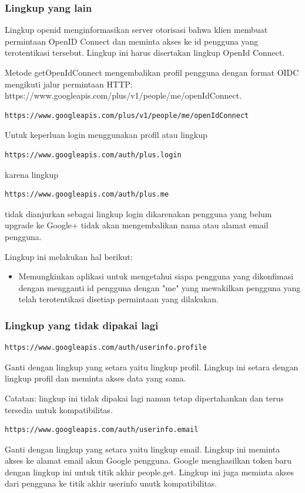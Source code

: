 \subsubsection{Lingkup yang lain}
Lingkup openid menginformasikan server otorisasi bahwa klien membuat permintaan OpenID Connect dan meminta akses ke id pengguna yang terotentikasi tersebut. Lingkup ini harus disertakan lingkup OpenId Connect.

Metode getOpenIdConnect mengembalikan profil pengguna dengan format OIDC mengikuti jalur permintaan HTTP:
https://www.googleapis.com/plus/v1/people/me/openIdConnect.

\begin{lstlisting}
https://www.googleapis.com/plus/v1/people/me/openIdConnect
\end{lstlisting}
Untuk keperluan login menggunakan profil atau lingkup
\begin{lstlisting}
https://www.googleapis.com/auth/plus.login
\end{lstlisting}
karena lingkup
\begin{lstlisting}
https://www.googleapis.com/auth/plus.me
\end{lstlisting}
tidak dianjurkan sebagai lingkup login dikarenakan pengguna yang belum upgrade ke Google+ tidak akan mengembalikan nama atau alamat email pengguna.

Lingkup ini melakukan hal berikut:
\begin{itemize}
\item
Memungkinkan aplikasi untuk mengetahui siapa pengguna yang dikonfimasi dengan mengganti id pengguna dengan "me" yang mewakilkan pengguna yang telah terotentikasi disetiap permintaan yang dilakukan.
\end{itemize}

\subsubsection{Lingkup yang tidak dipakai lagi}
\begin{lstlisting}
https://www.googleapis.com/auth/userinfo.profile
\end{lstlisting}
Ganti dengan lingkup yang setara yaitu lingkup profil. Lingkup ini setara dengan lingkup profil dan meminta akses data yang sama.

Catatan: lingkup ini tidak dipakai lagi namun tetap dipertahankan dan terus tersedia untuk kompatibilitas.

\begin{lstlisting}
https://www.googleapis.com/auth/userinfo.email
\end{lstlisting}
Ganti dengan lingkup yang setara yaitu lingkup email. Lingkup ini meminta akses ke alamat email akun Google pengguna.
Google menghasilkan token baru dengan lingkup ini untuk titik akhir people.get. Lingkup ini juga meminta akses dari pengguna ke titik akhir userinfo unutk kompatibilitas.

